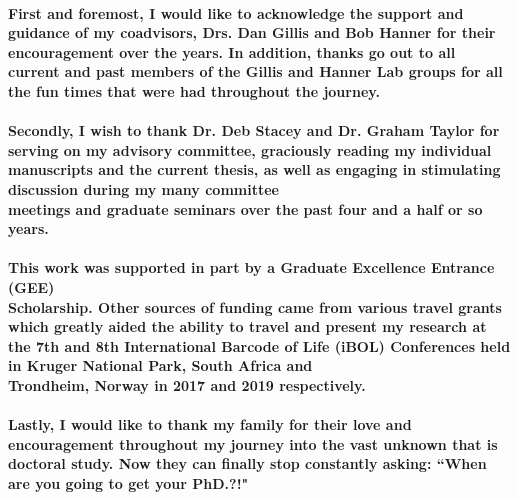 \begin{acknowledgements}\label{acknow}
\ssp
\paragraph*{First and foremost, I would like to acknowledge the support and guidance of my coadvisors, Drs. Dan Gillis and Bob Hanner for their encouragement over the years. In addition, thanks go out to all current and past members of the Gillis and Hanner Lab groups for all the fun times that were had throughout the journey.} 

\paragraph*{Secondly, I wish to thank Dr. Deb Stacey and Dr. Graham Taylor for serving on my advisory committee, graciously reading my individual manuscripts and the current thesis, as well as engaging in stimulating discussion during my many committee \\ meetings and graduate seminars over the past four and a half or so years.} 

\paragraph*{This work was supported in part by a Graduate Excellence Entrance (GEE) \\ Scholarship. Other sources of funding came from various travel grants which greatly aided the ability to travel and present my research at the 7th and 8th International Barcode of Life (iBOL) Conferences held in Kruger National Park, South Africa and \\ Trondheim, Norway in 2017 and 2019 respectively.}

\paragraph*{Lastly, I would like to thank my family for their love and encouragement throughout my journey into the vast unknown that is doctoral study. Now they can finally stop constantly asking: ``When are you going to get your PhD.?!"}

\end{acknowledgements}
\dsp
